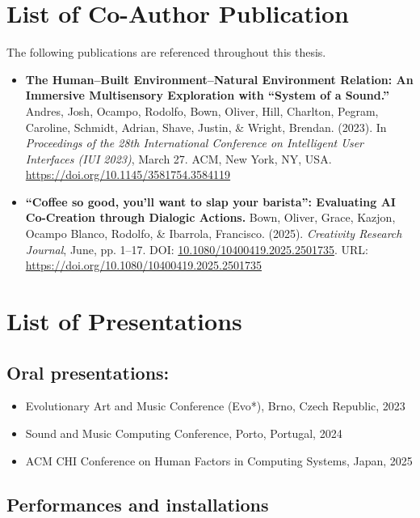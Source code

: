 \section*{List of Co-Author Publication}

The following publications are referenced throughout this thesis. 

\begin{itemize}

\item \textbf{The Human–Built Environment–Natural Environment Relation: An Immersive Multisensory Exploration with “System of a Sound.”} Andres, Josh, Ocampo, Rodolfo, Bown, Oliver, Hill, Charlton, Pegram, Caroline, Schmidt, Adrian, Shave, Justin, \& Wright, Brendan. (2023). In \textit{Proceedings of the 28th International Conference on Intelligent User Interfaces (IUI 2023)}, March 27. ACM, New York, NY, USA. \url{https://doi.org/10.1145/3581754.3584119}


\item \textbf{“Coffee so good, you’ll want to slap your barista”: Evaluating AI Co-Creation through Dialogic Actions.} Bown, Oliver, Grace, Kazjon, Ocampo Blanco, Rodolfo, \& Ibarrola, Francisco. (2025). \textit{Creativity Research Journal}, June, pp. 1–17. DOI: \href{https://doi.org/10.1080/10400419.2025.2501735}{10.1080/10400419.2025.2501735}. URL: \url{https://doi.org/10.1080/10400419.2025.2501735}


\end{itemize}

\section*{List of Presentations}

\subsection*{Oral presentations:} 

\begin{itemize}
\item Evolutionary Art and Music Conference (Evo*), Brno, Czech Republic, 2023
\item Sound and Music Computing Conference, Porto, Portugal, 2024
\item ACM CHI Conference on Human Factors in Computing Systems, Japan, 2025


\end{itemize}


\subsection*{Performances and installations}

